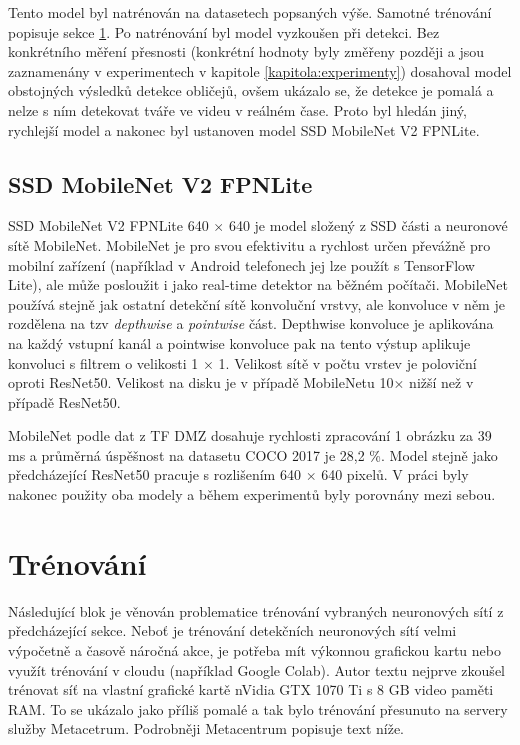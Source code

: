 Tento model byl natrénován na datasetech popsaných výše. Samotné trénování popisuje sekce \ref{sekce:trenovani}. Po natrénování byl model vyzkoušen při detekci. Bez konkrétního měření přesnosti (konkrétní hodnoty byly změřeny později a jsou zaznamenány v experimentech v kapitole \ref{kapitola:experimenty}) dosahoval model obstojných výsledků detekce obličejů, ovšem ukázalo se, že detekce je pomalá a nelze s ním detekovat tváře ve videu v reálném čase. Proto byl hledán jiný, rychlejší model a nakonec byl ustanoven model SSD MobileNet V2 FPNLite.

\subsection*{SSD MobileNet V2 FPNLite}
SSD MobileNet V2 FPNLite 640 $\times$ 640 je model složený z SSD části a neuronové sítě MobileNet. MobileNet \cite{mobilenet} je pro svou efektivitu a rychlost určen převážně pro mobilní zařízení (například v Android telefonech jej lze použít s TensorFlow Lite), ale může posloužit i jako real-time detektor na běžném počítači. MobileNet používá stejně jak ostatní  detekční sítě konvoluční vrstvy, ale konvoluce v něm je rozdělena na tzv \emph{depthwise} a \emph{pointwise} část. Depthwise konvoluce je aplikována na každý vstupní kanál a pointwise konvoluce pak na tento výstup aplikuje konvoluci s filtrem o velikosti 1 $\times$ 1. Velikost sítě v počtu vrstev je poloviční oproti ResNet50. Velikost na disku je v případě MobileNetu 10$\times$ nižší než v případě ResNet50.

MobileNet podle dat z TF DMZ dosahuje rychlosti zpracování 1 obrázku za 39 ms a průměrná úspěšnost na datasetu COCO 2017 je 28,2 \%. Model stejně jako předcházející ResNet50 pracuje s rozlišením 640 $\times$ 640 pixelů. V práci byly nakonec použity oba modely a během experimentů byly porovnány mezi sebou.

\section{Trénování}
\label{sekce:trenovani}
Následující blok je věnován problematice trénování vybraných neuronových sítí z předcházející sekce. Neboť je trénování detekčních neuronových sítí velmi výpočetně a časově náročná akce, je potřeba mít výkonnou grafickou kartu nebo využít trénování v cloudu (například Google Colab). Autor textu nejprve zkoušel trénovat síť na vlastní grafické kartě nVidia GTX 1070 Ti s 8 GB video paměti RAM. To se ukázalo jako příliš pomalé a tak bylo trénování přesunuto na servery služby Metacetrum. Podrobněji Metacentrum popisuje text níže.

